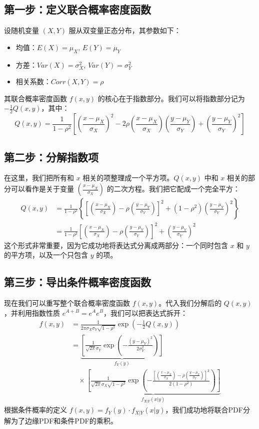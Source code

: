 \documentclass[UTF8]{ctexart}
\begin{document}
\subsection*{第一步：定义联合概率密度函数 }

设随机变量 $(X, Y)$ 服从双变量正态分布，其参数如下：
\begin{itemize}
    \item 均值：$E(X) = \mu_X$, $E(Y) = \mu_Y$
    \item 方差：$Var(X) = \sigma_X^2$, $Var(Y) = \sigma_Y^2$
    \item 相关系数：$Corr(X, Y) = \rho$
\end{itemize}

其联合概率密度函数 $f(x, y)$ 的核心在于指数部分。我们可以将指数部分记为 $-\frac{1}{2}Q(x,y)$，其中：
$$
Q(x,y) = \frac{1}{1-\rho^2} \left[ \left(\frac{x-\mu_X}{\sigma_X}\right)^2 - 2\rho\left(\frac{x-\mu_X}{\sigma_X}\right)\left(\frac{y-\mu_Y}{\sigma_Y}\right) + \left(\frac{y-\mu_Y}{\sigma_Y}\right)^2 \right]
$$

\subsection*{第二步：分解指数项}

在这里，我们把所有和 $x$ 相关的项整理成一个平方项。$Q(x, y)$ 中和 $x$ 相关的部分可以看作是关于变量 $(\frac{x-\mu_X}{\sigma_X})$ 的二次方程。我们把它配成一个完全平方：
\begin{align*}
Q(x,y) &= \frac{1}{1-\rho^2} \left\{ \left[ \left(\frac{x-\mu_X}{\sigma_X}\right) - \rho\left(\frac{y-\mu_Y}{\sigma_Y}\right) \right]^2 + (1-\rho^2)\left(\frac{y-\mu_Y}{\sigma_Y}\right)^2 \right\} \\
&= \frac{1}{1-\rho^2} \left[ \left(\frac{x-\mu_X}{\sigma_X}\right) - \rho\left(\frac{y-\mu_Y}{\sigma_Y}\right) \right]^2 + \left(\frac{y-\mu_Y}{\sigma_Y}\right)^2
\end{align*}
这个形式非常重要，因为它成功地将表达式分离成两部分：一个同时包含 $x$ 和 $y$ 的平方项，以及一个只包含 $y$ 的项。

\subsection*{第三步：导出条件概率密度函数}

现在我们可以重写整个联合概率密度函数 $f(x,y)$。代入我们分解后的 $Q(x,y)$，并利用指数性质 $e^{A+B} = e^A e^B$，我们可以把表达式拆开：
\begin{align*}
f(x,y) &= \frac{1}{2\pi\sigma_X\sigma_Y\sqrt{1-\rho^2}} \exp\left(-\frac{1}{2}Q(x,y)\right) \\
&= \underbrace{\left[ \frac{1}{\sqrt{2\pi}\sigma_Y} \exp\left( -\frac{(y-\mu_Y)^2}{2\sigma_Y^2} \right) \right]}_{f_Y(y)} \\
& \quad \times \underbrace{\left[ \frac{1}{\sqrt{2\pi}\sigma_X\sqrt{1-\rho^2}} \exp\left( -\frac{\left[ \left(\frac{x-\mu_X}{\sigma_X}\right) - \rho\left(\frac{y-\mu_Y}{\sigma_Y}\right) \right]^2}{2(1-\rho^2)} \right) \right]}_{f_{X|Y}(x|y)}
\end{align*}
根据条件概率的定义 $f(x,y) = f_Y(y) \cdot f_{X|Y}(x|y)$，我们成功地将联合PDF分解为了边缘PDF和条件PDF的乘积。
\end{document}
